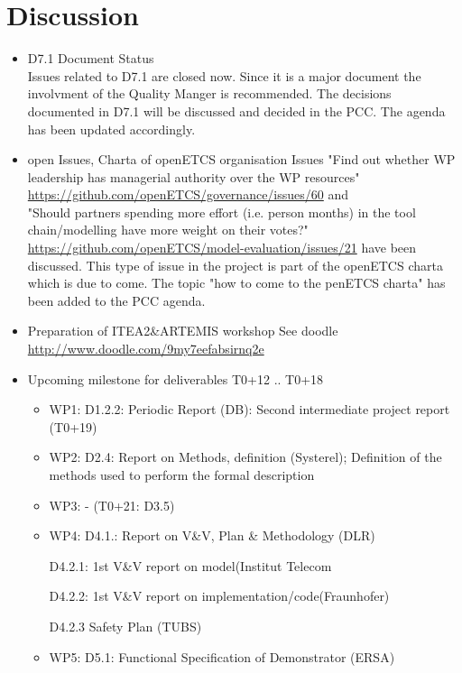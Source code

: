 \documentclass[a4paper, 11pt]{article}
\begin{document}
\section{Discussion}
\begin{itemize}
\item D7.1 Document Status\\
Issues related to D7.1 are closed now. Since it is a major document the involvment of the Quality Manger is recommended. The decisions documented in D7.1 will be discussed and decided in the PCC. The agenda has been updated accordingly.

\item open Issues, Charta of openETCS organisation
Issues  "Find out whether WP leadership has managerial authority over the WP resources"\\
\url{https://github.com/openETCS/governance/issues/60} and\\
 "Should partners spending more effort (i.e. person months) in the tool chain/modelling have more weight on their votes?"\\ \url{https://github.com/openETCS/model-evaluation/issues/21} have been discussed. This type of issue in the project is part of the openETCS charta which is due to come. The topic "how to come to the penETCS charta" has been added to the PCC agenda. 

\item Preparation of ITEA2\&ARTEMIS workshop
See doodle\\
\url{http://www.doodle.com/9my7eefabsirnq2e}

\item Upcoming milestone for deliverables T0+12 .. T0+18
\begin{itemize}
\item WP1: D1.2.2: Periodic Report (DB): Second intermediate project report (T0+19)
\item WP2: D2.4: Report on Methods, definition (Systerel); Definition of the methods used to perform the formal description
\item WP3:  - (T0+21: D3.5)
\item WP4: D4.1.: Report on V\&V, Plan \& Methodology (DLR)

          D4.2.1: 1st V\&V report on model(Institut Telecom
          
          D4.2.2: 1st V\&V report on implementation/code(Fraunhofer)
          
          D4.2.3 Safety Plan (TUBS)

\item WP5: D5.1: Functional Specification of Demonstrator (ERSA)


\end{itemize}
\end{itemize}
\end{document}
